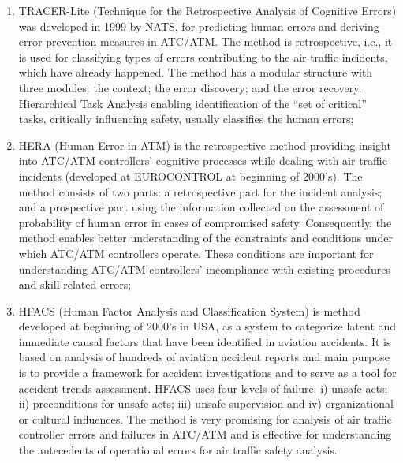 \documentclass[a4paper, 10pt]{article}
\begin{document}
\begin{enumerate}
\begin{enumerate}
		\item TRACER-Lite (Technique for the Retrospective
				Analysis of Cognitive Errors) was developed in 1999 by
				NATS, for predicting human errors and deriving error
				prevention measures in ATC/ATM. The method is
				retrospective, i.e., it is used for classifying types of errors
				contributing to the air traffic incidents, which have already
				happened. The method has a modular structure with three
				modules: the context; the error discovery; and the error
				recovery. Hierarchical Task Analysis enabling identification of
				the “set of critical” tasks, critically influencing safety, usually
				classifies the human errors;
		\item HERA (Human Error in ATM) is the retrospective
				method providing insight into ATC/ATM controllers’ cognitive
				processes while dealing with air traffic incidents (developed at
				EUROCONTROL at beginning of 2000’s). The method
				consists of two parts: a retrospective part for the incident
				analysis; and a prospective part using the information collected
				on the assessment of probability of human error in cases of
				compromised safety. Consequently, the method enables better
				understanding of the constraints and conditions under which
				ATC/ATM controllers operate. These conditions are important
				for understanding ATC/ATM controllers’ incompliance with
				existing procedures and skill-related errors;
		\item HFACS (Human Factor Analysis and Classification
				System) is method developed at beginning of 2000’s in USA,
				as a system to categorize latent and immediate causal factors
				that have been identified in aviation accidents. It is based on
				analysis of hundreds of aviation accident reports and main purpose is to provide a framework for accident investigations
				and to serve as a tool for accident trends assessment. HFACS
				uses four levels of failure: i) unsafe acts; ii) preconditions for
				unsafe acts; iii) unsafe supervision and iv) organizational or
				cultural influences. The method is very promising for analysis
				of air traffic controller errors and failures in ATC/ATM and is
				effective for understanding the antecedents of operational
				errors for air traffic safety analysis.
\end{enumerate}\par


\end{enumerate}
\end{document}
